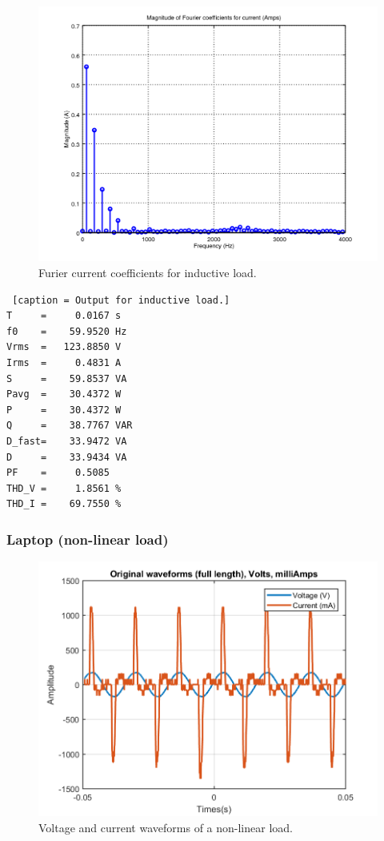 \documentclass[journal]{IEEEtran}
\begin{document}
\begin{figure}[h]
\centering
\includegraphics[clip,width=\columnwidth]
{zoomed_current_furier_coefficients_drill.png}
\caption{Furier current coefficients for inductive load.}
\label{fourier_corrent_coefficients_inductive}
\end{figure}

\begin{lstlisting} [caption = Output for inductive load.]
T     =     0.0167 s 
f0    =    59.9520 Hz 
Vrms  =   123.8850 V
Irms  =     0.4831 A
S     =    59.8537 VA
Pavg  =    30.4372 W 
P     =    30.4372 W 
Q     =    38.7767 VAR 
D_fast=    33.9472 VA 
D     =    33.9434 VA 
PF    =     0.5085 
THD_V =     1.8561 %
THD_I =    69.7550 %
\end{lstlisting}

\subsubsection{Laptop (non-linear load)}

\begin{figure}[h]
\centering
\includegraphics[clip,width=\columnwidth]
{original_waveform_computer.png}
\caption{Voltage and current waveforms of a non-linear load.}
\label{original_no_lineal_load}
\end{figure}
\end{document}
